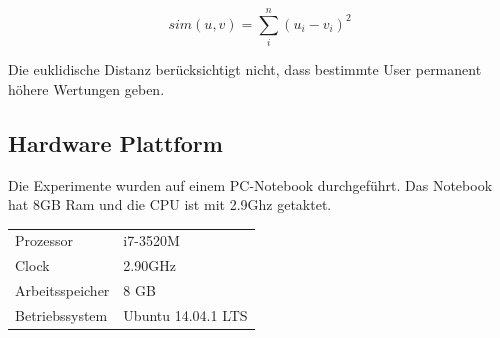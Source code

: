 \documentclass[a4paper, 12pt]{article}
\begin{document}
\begin{equation}
  \label{eq:euclid}
 sim(u,v) = \sum_i^n (u_i - v_i )^2
\end{equation}

Die euklidische Distanz berücksichtigt nicht, dass bestimmte User permanent höhere Wertungen geben.

\subsection{Hardware Plattform}
\label{platform}

Die Experimente wurden auf einem PC-Notebook durchgeführt. Das Notebook hat 8GB Ram und die CPU ist mit 2.9Ghz getaktet.

\begin{center}
\begin{tabular}{ll}
 Prozessor        &  i7-3520M            \\
 Clock            &  2.90GHz             \\
 Arbeitsspeicher  &  8 GB                \\
 Betriebssystem   &  Ubuntu 14.04.1 LTS  \\
\end{tabular}
\end{center}



\end{document}
